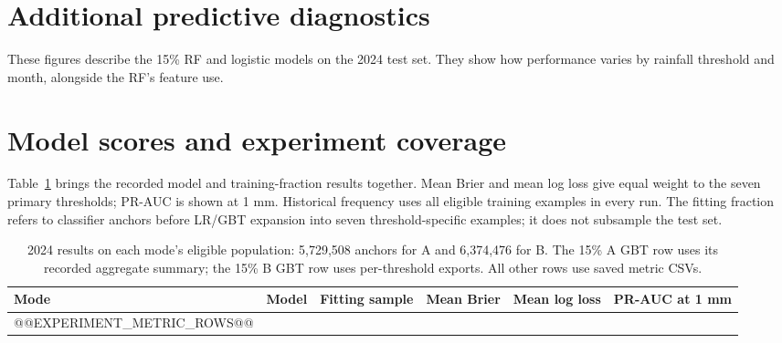 \section{Additional predictive diagnostics}\label{app:prediction}
These figures describe the 15\% RF and logistic models on the 2024 test set. They show how performance varies by rainfall threshold and month, alongside the RF's feature use.
\FloatBarrier

\clearpage
\section{Model scores and experiment coverage}\label{app:experiments}
Table~\ref{tab:allmodels} brings the recorded model and training-fraction results together. Mean Brier and mean log loss give equal weight to the seven primary thresholds; PR-AUC is shown at 1 mm. Historical frequency uses all eligible training examples in every run. The fitting fraction refers to classifier anchors before LR/GBT expansion into seven threshold-specific examples; it does not subsample the test set.
\begin{table}[htbp]\centering\small
\begin{tabular}{llrrrr}\toprule
Mode & Model & Fitting sample & Mean Brier & Mean log loss & PR-AUC at 1 mm\\\midrule
@@EXPERIMENT_METRIC_ROWS@@
\bottomrule\end{tabular}
\caption{2024 results on each mode's eligible population: 5,729,508 anchors for A and 6,374,476 for B. The 15\% A GBT row uses its recorded aggregate summary; the 15\% B GBT row uses per-threshold exports. All other rows use saved metric CSVs.}\label{tab:allmodels}
\end{table}

